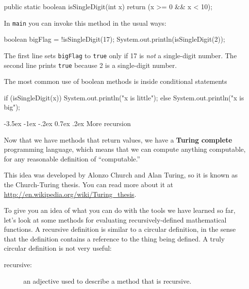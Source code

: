 \documentclass{book}
\makeatletter
\renewcommand{\section}{\@startsection 
    {section} {1} {0mm}%
    {-3.5ex \@plus -1ex \@minus -.2ex}%
    {0.7ex \@plus.2ex}%
    {\normalfont\Large\bfseries}}
\makeatother
\begin{document}
\begin{verbatimtab}
  public static boolean isSingleDigit(int x) {
    return (x >= 0 && x < 10);
  }
\end{verbatimtab}
%
In {\tt main} you can invoke this method in the usual ways:

\begin{verbatimtab}
  boolean bigFlag = !isSingleDigit(17);
  System.out.println(isSingleDigit(2));
\end{verbatimtab}
%
The first line sets {\tt bigFlag} to {\tt true}
only if 17 is {\em not} a single-digit number.  The second
line prints {\tt true} because 2 is a single-digit number.

The most common use of boolean methods is inside conditional
statements

\begin{verbatimtab}
    if (isSingleDigit(x)) {
      System.out.println("x is little");
    } else {
      System.out.println("x is big");
    }
\end{verbatimtab}


\section {More recursion}

Now that we have methods that return values, we have a {\bf Turing
  complete} programming language, which means that we can compute
anything computable, for any reasonable definition of ``computable.''

This idea was developed by Alonzo Church and Alan Turing, so it is
known as the Church-Turing thesis.  You can read more about it at
\url{http://en.wikipedia.org/wiki/Turing_thesis}.

To give you an idea of what you can do with the tools we have learned
so far, let's look at some methods for evaluating
recursively-defined mathematical functions.  A recursive definition is
similar to a circular definition, in the sense that the definition
contains a reference to the thing being defined.  A truly circular
definition is not very useful:

\begin{description}

\item[recursive:] an adjective used to describe a method that is recursive.


\end{description}
\end{document}
